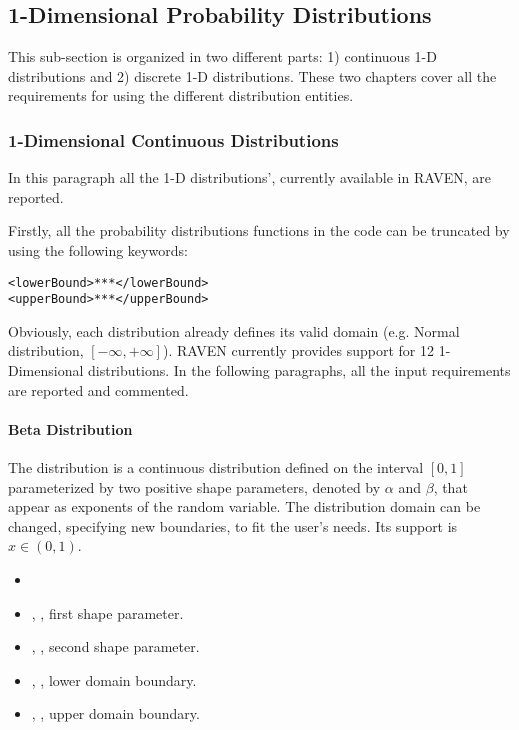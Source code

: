 \subsection{1-Dimensional Probability Distributions}
\label{subsec:1dDist}
This sub-section is organized in two different parts: 1) continuous 1-D
distributions and 2) discrete 1-D distributions.
These two chapters cover all the requirements for using the different
distribution entities. 
\subsubsection{1-Dimensional Continuous Distributions}
\label{subsubsec:1DContinuous}
In this paragraph all the 1-D distributions', currently available in RAVEN, are
reported.

Firstly, all the probability distributions functions in the code can be
truncated by using the following keywords:
\begin{lstlisting}[style=XML]
<lowerBound>***</lowerBound>
<upperBound>***</upperBound>
\end{lstlisting}
Obviously, each distribution already defines its valid domain (e.g. Normal
distribution, $[-\infty,+\infty]$). 
%
RAVEN currently provides support for 12 1-Dimensional distributions.
%
In the following paragraphs, all the input requirements are reported and
commented.

\paragraph{Beta Distribution}
\label{Beta}
The  distribution is a continuous distribution defined on the
interval $[0,1]$ parameterized by two positive shape parameters, denoted by
$\alpha$ and $\beta$, that appear as exponents of the random variable.
%
The distribution domain can be changed, specifying new boundaries, to fit the
user's needs.
%
Its support is $x \in (0, 1)$.

%
\attrIntro
\vspace{-5mm}
\begin{itemize}
\itemsep0em
\item \nameDescription
\end{itemize}
\vspace{-5mm}
\subnodesIntro
\begin{itemize}
\item {}, , first shape
  parameter.
\item {}, , second shape
  parameter.
\item {}, , lower domain boundary.  
\item {}, , upper domain
  boundary.
\end{itemize}

